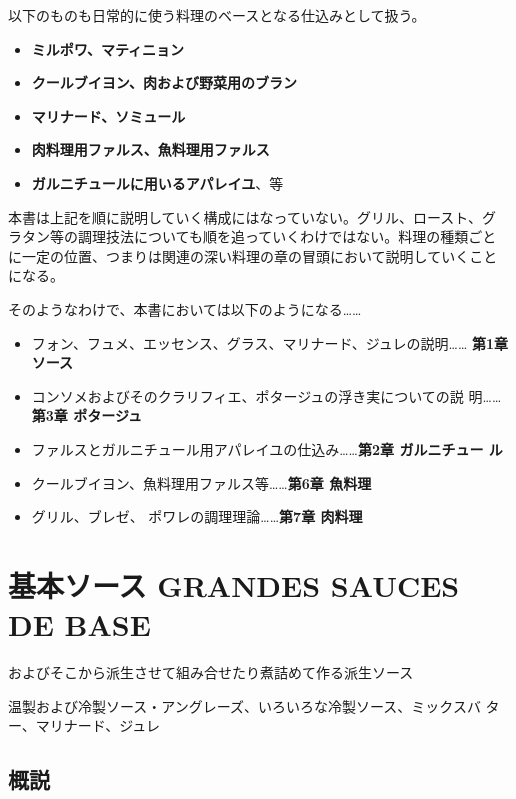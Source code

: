 \documentclass[twoside,12Q,b5paper]{escoffierltjsbook}
\def\tightlist{\itemsep1pt\parskip0pt\parsep0pt}
\begin{document}
以下のものも日常的に使う料理のベースとなる仕込みとして扱う。

\begin{itemize}
\tightlist
\item
  \textbf{ミルポワ、マティニョン}
\item
  \textbf{クールブイヨン、肉および野菜用のブラン}
\item
  \textbf{マリナード、ソミュール}
\item
  \textbf{肉料理用ファルス、魚料理用ファルス}
\item
  \textbf{ガルニチュールに用いるアパレイユ}、等
\end{itemize}

本書は上記を順に説明していく構成にはなっていない。グリル、ロースト、グ
ラタン等の調理技法についても順を追っていくわけではない。料理の種類ごと
に一定の位置、つまりは関連の深い料理の章の冒頭において説明していくこと
になる。

そのようなわけで、本書においては以下のようになる\ldots{}\ldots{}

\begin{itemize}
\tightlist
\item
  フォン、フュメ、エッセンス、グラス、マリナード、ジュレの説明\ldots{}\ldots{}
  \textbf{ 第1章 ソース}
\item
  コンソメおよびそのクラリフィエ、ポタージュの浮き実についての説
  明\ldots{}\ldots{}\textbf{第3章 ポタージュ}
\item
  ファルスとガルニチュール用アパレイユの仕込み\ldots{}\ldots{}\textbf{第2章
  ガルニチュー ル}
\item
  クールブイヨン、魚料理用ファルス等\ldots{}\ldots{}\textbf{第6章
  魚料理}
\item
  グリル、ブレゼ、 ポワレの調理理論\ldots{}\ldots{}\textbf{第7章 肉料理}
\end{itemize}

\newpage

\section*{基本ソース GRANDES SAUCES DE
BASE}\label{ux57faux672cux30bdux30fcux30b9-grandes-sauces-de-base}

およびそこから派生させて組み合せたり煮詰めて作る派生ソース

温製および冷製ソース・アングレーズ、いろいろな冷製ソース、ミックスバ
ター、マリナード、ジュレ

\subsection*{概説}\label{ux6982ux8aac}
\end{document}
